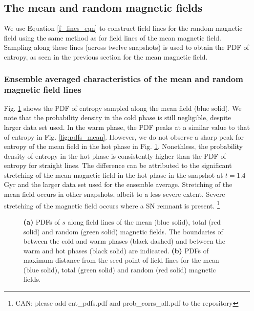 \documentclass[useAMS,usenatbib]{mn2e}
\begin{document}
\subsection{The mean and random magnetic fields}
We use Equation \eqref{f_lines_eqn} to construct field lines for the random magnetic field using the same method as for field lines of the mean magnetic field. Sampling along these lines (across twelve snapshots) is used to obtain the PDF of entropy, as seen in the previous section for the mean magnetic field. 
\subsubsection{Ensemble averaged characteristics of the mean and random magnetic field lines }
Fig. \ref{fig:tot_pdfs} shows the PDF of entropy sampled along the mean field (blue solid). We note that the probability density in the cold phase is still negligible, despite larger data set used. In the warm phase, the PDF peaks at a similar value to that of entropy in Fig. \ref{fig:pdfs_mean}. However, we do not observe a sharp peak for entropy of the mean field in the hot phase in Fig. \ref{fig:tot_pdfs}. Nonethless, the probability density of entropy in the hot phase is consistently higher than the PDF of entropy for straight lines. The difference can be attributed to the significant stretching of the mean magnetic field in the hot phase in the snapshot at $t=1.4$ Gyr and the larger data set used for the ensemble average. Stretching of the mean field occurs in other snapshots, albeit to a less severe extent. Severe stretching of the magnetic field occurs where a SN remnant is present. 
\footnote{CAN: please add ent\_pdfs.pdf and prob\_corrs\_all.pdf to the repository} 
\begin{figure}
\caption{\textbf{(a)} PDFs of $s$ along field lines of the mean (blue solid), total (red solid) and random (green solid) magnetic fields. The boundaries of between the cold and warm phases (black dashed) and between the warm and hot phases (black solid) are indicated. \textbf{(b)} PDFs of maximum distance from the seed point of field lines for the mean (blue solid), total (green solid) and random (red solid) magnetic fields.}
\label{fig:tot_pdfs}
\end{figure}
\end{document}
